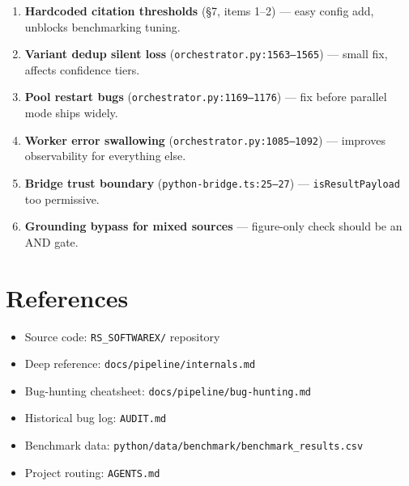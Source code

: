 \documentclass[11pt,a4paper]{article}
\begin{document}
\begin{enumerate}[itemsep=2pt]
\item \textbf{Hardcoded citation thresholds} (\S7, items 1--2) --- easy config add, unblocks benchmarking tuning.
\item \textbf{Variant dedup silent loss} (\texttt{orchestrator.py:1563--1565}) --- small fix, affects confidence tiers.
\item \textbf{Pool restart bugs} (\texttt{orchestrator.py:1169--1176}) --- fix before parallel mode ships widely.
\item \textbf{Worker error swallowing} (\texttt{orchestrator.py:1085--1092}) --- improves observability for everything else.
\item \textbf{Bridge trust boundary} (\texttt{python-bridge.ts:25--27}) --- \texttt{isResultPayload} too permissive.
\item \textbf{Grounding bypass for mixed sources} --- figure-only check should be an AND gate.
\end{enumerate}

\section*{References}

\begin{itemize}[leftmargin=2em,itemsep=2pt]
\item Source code: \texttt{RS\_SOFTWAREX/} repository
\item Deep reference: \texttt{docs/pipeline/internals.md}
\item Bug-hunting cheatsheet: \texttt{docs/pipeline/bug-hunting.md}
\item Historical bug log: \texttt{AUDIT.md}
\item Benchmark data: \texttt{python/data/benchmark/benchmark\_results.csv}
\item Project routing: \texttt{AGENTS.md}
\end{itemize}
\end{document}
